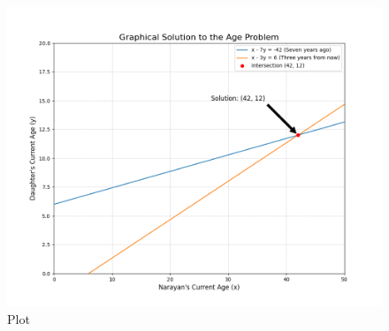 \documentclass{beamer}
\begin{document}
\begin{figure}[H]
    \centering
    \includegraphics[width=0.7\columnwidth]{graph12.png}
    \caption{Plot}
    \label{fig:placeholder}
\end{figure}
\end{document}
